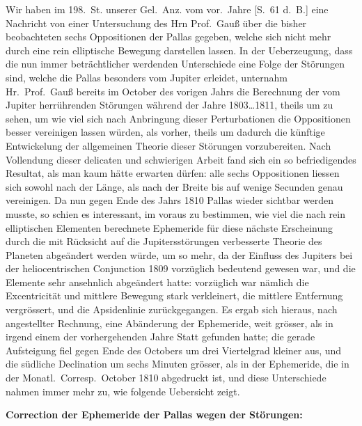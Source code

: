 \documentclass[12pt,a4paper]{book}
\begin{document}
Wir haben im 198.~St. unserer Gel.~Anz. vom vor.~Jahre [S.~61 d.~B.] eine Nachricht von einer Untersuchung des Hrn Prof.~Gau{\ss} \"uber die bisher beobachteten sechs Oppositionen der Pallas gegeben, welche sich nicht mehr durch eine rein elliptische Bewegung darstellen lassen. In der Ueberzeugung, dass die nun immer betr\"achtlicher werdenden Unterschiede eine Folge der St\"orungen sind, welche die Pallas besonders vom Jupiter erleidet, unternahm Hr.~Prof.~Gau{\ss} bereits im October des vorigen Jahrs die Berechnung der vom Jupiter herr\"uhrenden St\"orungen w\"ahrend der Jahre 1803\ldots 1811, theils um zu sehen, um wie viel sich nach Anbringung dieser Perturbationen die Oppositionen besser vereinigen lassen w\"urden, als vorher, theils um dadurch die k\"unftige Entwickelung der allgemeinen Theorie dieser St\"orungen vorzubereiten. Nach Vollendung dieser delicaten und schwierigen Arbeit fand sich ein so befriedigendes Resultat, als man kaum h\"atte erwarten d\"urfen: alle sechs Oppositionen liessen sich sowohl nach der L\"ange, als nach der Breite bis auf wenige Secunden genau vereinigen. Da nun gegen Ende des Jahrs 1810 Pallas wieder sichtbar werden musste, so schien es interessant, im voraus zu bestimmen, wie viel die nach rein elliptischen Elementen berechnete Ephemeride f\"ur diese n\"achste Erscheinung durch die mit R\"ucksicht auf die Jupitersst\"orungen verbesserte Theorie des Planeten abge\"andert werden w\"urde, um so mehr, da der Einfluss des Jupiters bei der heliocentrischen Conjunction 1809 vorz\"uglich bedeutend gewesen war, und die Elemente sehr ansehnlich abge\"andert hatte: vorz\"uglich war n\"amlich die Excentricit\"at und mittlere Bewegung stark verkleinert, die mittlere Entfernung vergr\"ossert, und die Apsidenlinie zur\"uckgegangen. Es ergab sich hieraus, nach angestellter Rechnung, eine Ab\"anderung der Ephemeride, weit gr\"osser, als in irgend einem der vorhergehenden Jahre Statt gefunden hatte; die gerade Aufsteigung fiel gegen Ende des Octobers um drei Viertelgrad kleiner aus, und die s\"udliche Declination um sechs Minuten gr\"osser, als in der Ephemeride, die in der Monatl.~Corresp.~October 1810 abgedruckt ist, und diese Unterschiede nahmen immer mehr zu, wie folgende Uebersicht zeigt.

\textbf{Correction der Ephemeride der Pallas wegen der St\"orungen:}
\end{document}
